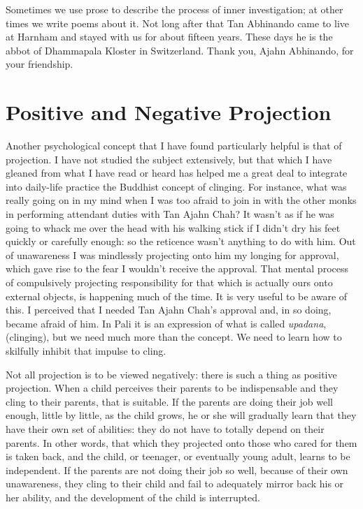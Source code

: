 Sometimes we use prose to describe the process of inner investigation;
at other times we write poems about it. Not long after that Tan
Abhinando came to live at Harnham and stayed with us for about fifteen
years. These days he is the abbot of Dhammapala Kloster in Switzerland.
Thank you, Ajahn Abhinando, for your friendship.

\section{Positive and Negative Projection}

Another psychological concept that I have found particularly helpful is
that of projection. I have not studied the subject extensively, but that
which I have gleaned from what I have read or heard has helped me a
great deal to integrate
into daily-life practice the Buddhist concept of clinging.
For instance, what was really going on in my mind when I was
too afraid to join in with the other monks in performing attendant
duties with Tan Ajahn Chah? It wasn't as if he was going to whack me
over the head with his walking stick if I didn't dry his feet quickly or
carefully enough: so the reticence wasn't anything to do with him. Out
of unawareness I was mindlessly projecting onto him my longing for
approval, which gave rise to the fear I wouldn't receive the approval.
That mental process of compulsively projecting responsibility for that
which is actually ours onto external objects, is happening much of the time.
It is very useful to be aware of this. I perceived that I needed Tan Ajahn
Chah's approval and, in so doing, became afraid of him. In Pali it is an
expression of what is called \emph{upadana}, (clinging), but we need
much more than the concept. We need to learn how to skilfully inhibit
that impulse to cling.

Not all projection is to be viewed negatively: there is such a thing as
positive projection. When a child perceives their parents to be
indispensable and they cling to their parents, that is suitable. If the
parents are doing their job well enough, little by little, as the child
grows, he or she will gradually learn that they have their own set of
abilities: they do not have to totally depend on their parents. In other
words, that which they projected onto those who cared for them is taken
back, and the child, or teenager, or eventually young adult, learns to
be independent. If the parents are not doing their job so well, because
of their own unawareness, they cling to their child and fail to
adequately mirror back his or her ability, and the development of the
child is interrupted.

